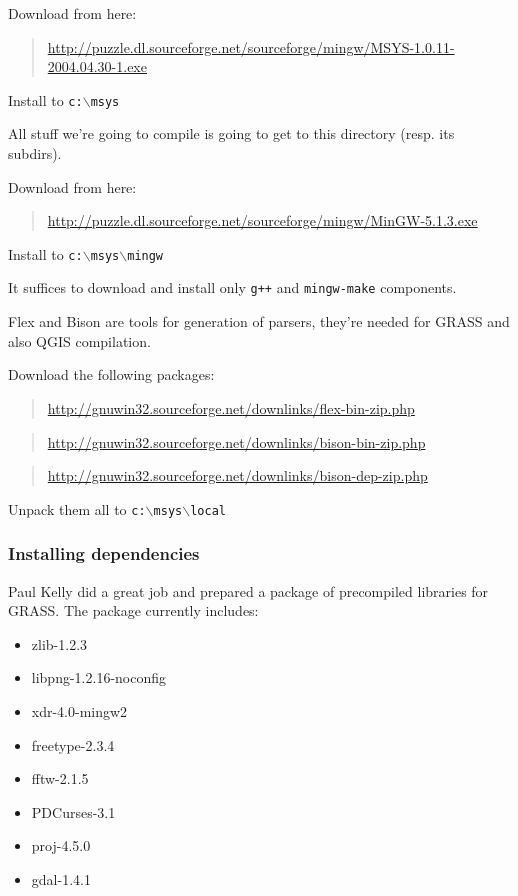 Download from here:

	\begin{quotation}
\url{http://puzzle.dl.sourceforge.net/sourceforge/mingw/MSYS-1.0.11-2004.04.30-1.exe}
	\end{quotation}

Install to \texttt{c:$\backslash$msys}

All stuff we're going to compile is going to get to this directory (resp. its subdirs).

\hypertarget{toc64}{}
Download from here:

	\begin{quotation}
\url{http://puzzle.dl.sourceforge.net/sourceforge/mingw/MinGW-5.1.3.exe}
	\end{quotation}

Install to \texttt{c:$\backslash$msys$\backslash$mingw}

It suffices to download and install only \texttt{g++} and \texttt{mingw-make} components.

\hypertarget{toc65}{}
Flex and Bison are tools for generation of parsers, they're needed for GRASS and also QGIS compilation.

Download the following packages:

	\begin{quotation}
\url{http://gnuwin32.sourceforge.net/downlinks/flex-bin-zip.php}
	\end{quotation}

	\begin{quotation}
\url{http://gnuwin32.sourceforge.net/downlinks/bison-bin-zip.php}
	\end{quotation}

	\begin{quotation}
\url{http://gnuwin32.sourceforge.net/downlinks/bison-dep-zip.php}
	\end{quotation}

Unpack them all to \texttt{c:$\backslash$msys$\backslash$local}

\hypertarget{toc66}{}
\subsubsection{Installing dependencies}
\hypertarget{toc67}{}
Paul Kelly did a great job and prepared a package of precompiled libraries for GRASS.
The package currently includes:

\begin{itemize}
\item zlib-1.2.3
\item libpng-1.2.16-noconfig
\item xdr-4.0-mingw2
\item freetype-2.3.4
\item fftw-2.1.5
\item PDCurses-3.1
\item proj-4.5.0
\item gdal-1.4.1
\end{itemize}

